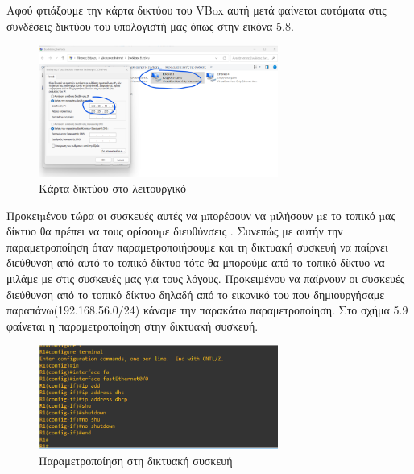 Αφού φτιάξουμε την κάρτα δικτύου του VBox αυτή μετά φαίνεται αυτόματα στις συνδέσεις δικτύου του υπολογιστή μας όπως στην εικόνα 5.8.

\FloatBarrier

\begin{figure}[htb]
	\centering
	\includegraphics[width=0.7\textwidth]{graphics/windows_host_networking.png}
	\caption{Κάρτα δικτύου στο  λειτουργικό}
\end{figure}

\FloatBarrier

Προκειµένου τώρα οι συσκευές αυτές να µπορέσουν να µιλήσουν µε το τοπικό µας δίκτυο θα πρέπει να τους ορίσουµε  διευθύνσεις . Συνεπώς με αυτήν την παραμετροποίηση όταν παραμετροποιήσουμε και τη δικτυακή συσκευή να παίρνει  διεύθυνση από αυτό το τοπικό δίκτυο τότε θα μπορούμε από το τοπικό δίκτυο να μιλάμε με στις συσκευές μας για τους  λόγους.
Προκειμένου να παίρνουν οι συσκευές  διεύθυνση από το τοπικό δίκτυο δηλαδή από το εικονικό  του  που δημιουργήσαμε παραπάνω(192.168.56.0/24) κάναμε την παρακάτω παραμετροποίηση.
Στο σχήμα 5.9 φαίνεται η παραμετροποίηση στην δικτυακή συσκευή.

\FloatBarrier

\begin{figure}[htb]
	\centering
	\includegraphics[width=0.7\textwidth]{graphics/cisco_ssh_config_2.png}
	\caption{Παραμετροποίηση στη δικτυακή συσκευή}
\end{figure}

\FloatBarrier

